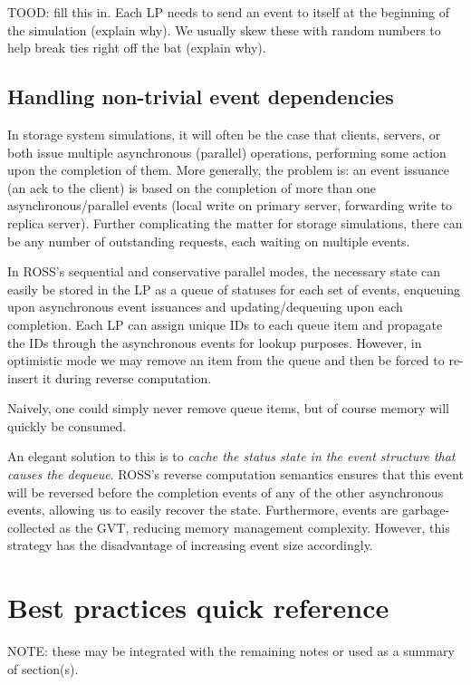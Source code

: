\documentclass[conference,10pt,compsocconf,onecolumn]{IEEEtran}
\begin{document}
TOOD: fill this in.  Each LP needs to send an event to itself at the
beginning of the simulation (explain why).  We usually skew these with
random numbers to help break ties right off the bat (explain why).

\subsection{Handling non-trivial event dependencies}

In storage system simulations, it will often be the case that clients, servers,
or both issue multiple asynchronous (parallel) operations, performing some
action upon the completion of them. More generally, the problem is: an event
issuance (an ack to the client) is based on the completion of more than one
asynchronous/parallel events (local write on primary server, forwarding write to
replica server). Further complicating the matter for storage simulations, there
can be any number of outstanding requests, each waiting on multiple events. 

In ROSS's sequential and conservative parallel modes, the necessary state can
easily be stored in the LP as a queue of statuses for each set of events,
enqueuing upon asynchronous event issuances and updating/dequeuing upon each
completion. Each LP can assign unique IDs to each queue item and propagate the
IDs through the asynchronous events for lookup purposes. However, in optimistic
mode we may remove an item from the queue and then be forced to re-insert it
during reverse computation.

Naively, one could simply never remove queue items, but of course memory will
quickly be consumed.

An elegant solution to this is to \emph{cache the status state in the event
structure that causes the dequeue}. ROSS's reverse computation semantics ensures
that this event will be reversed before the completion events of any of the
other asynchronous events, allowing us to easily recover the state. Furthermore,
events are garbage-collected as the GVT, reducing memory management complexity.
However, this strategy has the disadvantage of increasing event size
accordingly.

\section{Best practices quick reference}

NOTE: these may be integrated with the remaining notes or used as a summary of
section(s).
\end{document}
